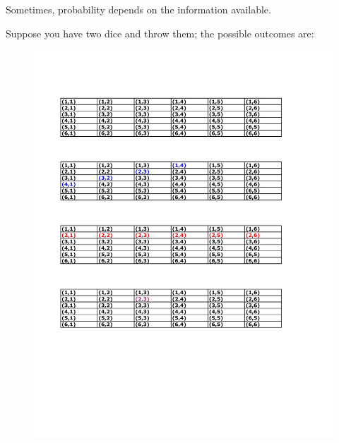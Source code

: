 \documentclass[notes=show, handout]{beamer}\usepackage[]{graphicx}\usepackage[]{color}
\begin{document}
\begin{frame}{\secname}
Sometimes, probability depends on the information available.
  \begin{example}
  Suppose you have two dice and throw them; the possible outcomes are:
  \begin{figure}[h!]
  \centering
  \includegraphics[scale=0.7]{img/c1.pdf}
  \end{figure}
  \end{example}
\end{frame}
\end{document}
